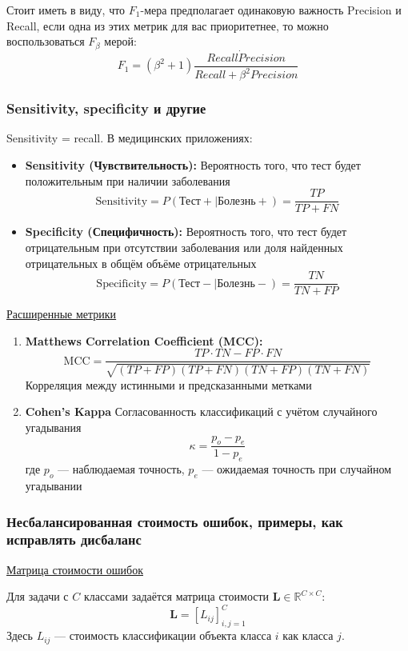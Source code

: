 Стоит иметь в виду, что $F_1$-мера предполагает одинаковую важность Precision и Recall, если одна из этих метрик для
вас приоритетнее, то можно воспользоваться $F_\beta$ мерой:
\[ F_1 = (\beta^2 + 1) \frac{Recall  \dot Precision}{Recall + \beta^2 Precision} \]

\subsubsection{Sensitivity, specificity и другие}

Sensitivity = recall.
В медицинских приложениях:
\begin{itemize}
    \item \textbf{Sensitivity (Чувствительность):} Вероятность того, что тест будет положительным при наличии заболевания
    \[ \text{Sensitivity} = P(\text{Тест} + \mid \text{Болезнь} +) = \frac{TP}{TP+FN} \]
    
    \item \textbf{Specificity (Специфичность):} Вероятность того, что тест будет отрицательным при отсутствии
    заболевания или доля найденных отрицательных в общём объёме отрицательных
    \[ \text{Specificity} = P(\text{Тест} - \mid \text{Болезнь} -) = \frac{TN}{TN+FP} \]
\end{itemize}

\underline{Расширенные метрики}

\begin{enumerate}
    \item \textbf{Matthews Correlation Coefficient (MCC):}
    \[ \text{MCC} = \frac{TP \cdot TN - FP \cdot FN}{\sqrt{(TP+FP)(TP+FN)(TN+FP)(TN+FN)}} \]
    Корреляция между истинными и предсказанными метками
    
    \item \textbf{Cohen's Kappa} Согласованность классификаций с учётом случайного угадывания
    \[ \kappa = \frac{p_o - p_e}{1 - p_e} \]
    где $p_o$ --- наблюдаемая точность, $p_e$ --- ожидаемая точность при случайном угадывании
\end{enumerate}

\subsubsection{Несбалансированная стоимость ошибок, примеры, как исправлять дисбаланс}

\underline{Матрица стоимости ошибок}

Для задачи с $C$ классами задаётся матрица стоимости $\mathbf{L} \in \mathbb{R}^{C \times C}$:
\[ \mathbf{L} = [L_{ij}]_{i,j=1}^C \]
Здесь $L_{ij}$ --- стоимость классификации объекта класса $i$ как класса $j$.

